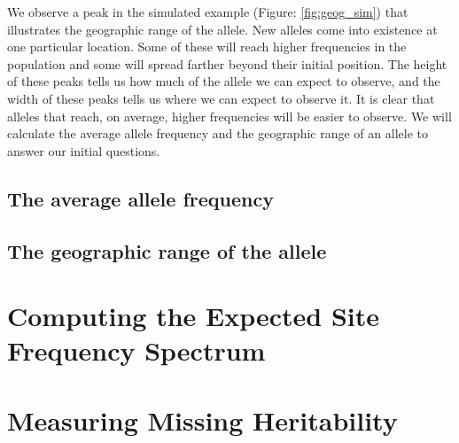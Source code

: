 We observe a peak in the simulated example (Figure: \ref{fig:geog_sim}) that illustrates the geographic range of the allele. New alleles come into existence at one particular location. Some of these will reach higher frequencies in the population and some will spread farther beyond their initial position. The height of these peaks tells us how much of the allele we can expect to observe, and the width of these peaks tells us where we can expect to observe it. It is clear that alleles that reach, on average, higher frequencies will be easier to observe. We will calculate the average allele frequency and the geographic range of an allele to answer our initial questions.



\subsection{The average allele frequency}


 

\subsection{The geographic range of the allele}


\section{Computing the Expected Site Frequency Spectrum}

\section{Measuring Missing Heritability}